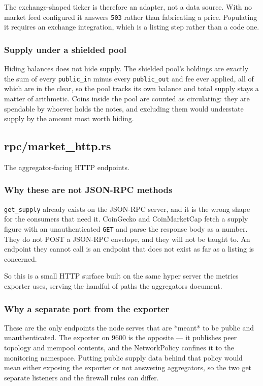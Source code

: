 \documentclass[11pt,a4paper]{article}
\begin{document}
The exchange-shaped ticker is therefore an adapter, not a data source. With
no market feed configured it answers \texttt{503} rather than fabricating a price.
Populating it requires an exchange integration, which is a listing step
rather than a code one.

\subsubsection{Supply under a shielded pool}

Hiding balances does not hide supply. The shielded pool's holdings are
exactly the sum of every \texttt{public\_in} minus every \texttt{public\_out} and fee ever
applied, all of which are in the clear, so the pool tracks its own balance
and total supply stays a matter of arithmetic. Coins inside the pool are
counted as circulating: they are spendable by whoever holds the notes, and
excluding them would understate supply by the amount most worth hiding.

\subsection{rpc/market\_http.rs}
The aggregator-facing HTTP endpoints.

\subsubsection{Why these are not JSON-RPC methods}

\texttt{get\_supply} already exists on the JSON-RPC server, and it is the wrong shape
for the consumers that need it. CoinGecko and CoinMarketCap fetch a supply
figure with an unauthenticated \texttt{GET} and parse the response body as a number.
They do not POST a JSON-RPC envelope, and they will not be taught to. An
endpoint they cannot call is an endpoint that does not exist as far as a
listing is concerned.

So this is a small HTTP surface built on the same hyper server the metrics
exporter uses, serving the handful of paths the aggregators document.

\subsubsection{Why a separate port from the exporter}

These are the only endpoints the node serves that are *meant* to be public
and unauthenticated. The exporter on 9600 is the opposite — it publishes peer
topology and mempool contents, and the NetworkPolicy confines it to the
monitoring namespace. Putting public supply data behind that policy would
mean either exposing the exporter or not answering aggregators, so the two
get separate listeners and the firewall rules can differ.
\end{document}
